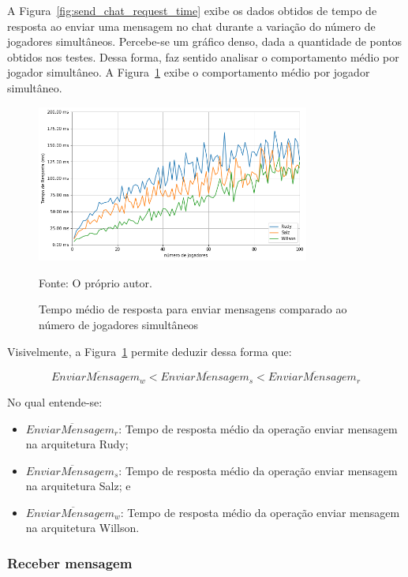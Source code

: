 A Figura~\ref{fig:send_chat_request_time} exibe os dados obtidos de tempo de resposta ao enviar uma mensagem no chat durante a variação do número de jogadores simultâneos.
%
Percebe-se um gráfico denso, dada a quantidade de pontos obtidos nos testes.
%
Dessa forma, faz sentido analisar o comportamento médio por jogador simultâneo.
%
A Figura~\ref{fig:send_chat_request_time_per_concurrency} exibe o comportamento médio por jogador simultâneo.


\begin{figure}[htb!]
  \caption{Tempo médio de resposta para enviar mensagens comparado ao número de jogadores simultâneos}
  \label{fig:send_chat_request_time_per_concurrency}
  \includegraphics[width=0.8\textwidth]{figuras/analise/rt/send_chat_request_time_per_concurrency}
  \centering

  Fonte: O próprio autor.
\end{figure}

Visivelmente, a Figura~\ref{fig:send_chat_request_time_per_concurrency} permite deduzir dessa forma que:

$$
  \overline{EnviarMensagem_{w}} < \overline{EnviarMensagem_{s}} <\overline{EnviarMensagem_{r}}
$$

No qual entende-se:

\begin{itemize}
 \item $\overline{EnviarMensagem_{r}}$: Tempo de resposta médio da operação enviar mensagem na arquitetura Rudy;
 \item $\overline{EnviarMensagem_{s}}$: Tempo de resposta médio da operação enviar mensagem na arquitetura Salz; e
 \item $\overline{EnviarMensagem_{w}}$: Tempo de resposta médio da operação enviar mensagem na arquitetura Willson.
\end{itemize}

\subsubsection{Receber mensagem}


